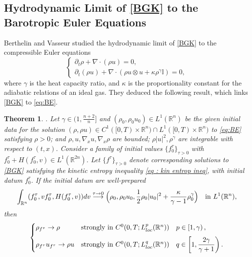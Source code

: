 \documentclass{amsart}
\theoremstyle{plain}
\newtheorem{theorem}{Theorem}[section]
\theoremstyle{remark}
\numberwithin{equation}{section}
\newcommand{\bbI}{\mathbb I}
\newcommand{\p}{\partial}
\newcommand{\R}{\mathbb{R}}
\newcommand{\dv}{\textnormal{d}v}
\newcommand{\To}{\longrightarrow}
\begin{document}
\subsection{Hydrodynamic Limit of \eqref{BGK} to the Barotropic Euler Equations} \label{subs: hyd}
Berthelin and Vasseur \cite{berthelinvasseur2005} studied the hydrodynamic limit of \eqref{BGK} to the compressible Euler equations
\begin{equation}
\label{eq:BE}
    \begin{cases}
        \p_t \rho + \nabla\cdot (\rho u) = 0,\\
        \p_t (\rho u) + \nabla \cdot (\rho u \otimes u + \kappa \rho^\gamma \bbI) = 0,
    \end{cases}
\end{equation}
where $\gamma$ is the heat capacity ratio, and $\kappa$ is the proportionality constant for the adiabatic relations of an ideal gas. They deduced the following result, which links \eqref{BGK} to \eqref{eq:BE}.
\begin{theorem}
\label{thm : hyd}
\cite[Theorem 1.1]{berthelinvasseur2005}. Let $\gamma \in (1,\frac{n+2}{n}]$ and $(\rho_0,\rho_0 u_0) \in L^1(\R^n)$ be the given initial data for the solution $(\rho, \rho u)\in C^1([0,T)\times\R^n) \cap L^1([0,T)\times \R^n)$ to \eqref{eq:BE} satisfying $\rho>0$; and $\rho,u,\nabla_x u, \nabla_x \rho$ are bounded; $\rho |u|^2,\rho^\gamma$ are integrable with respect to $(t,x)$. Consider a family of initial values $\{f^\tau_0\}_{\tau>0}$ with $f^\tau_0 + H(f^\tau_0,v)\in L^1(\R^{2n})$. Let $\{f^\tau\}_{\tau>0}$ denote corresponding solutions to \eqref{BGK} satisfying the kinetic entropy inequality \eqref{eq : kin entrop ineq}, with initial datum $f_0^\tau$. If the initial datum are \textit{well-prepared}
    \begin{align*}
        \int_{\R^n} (f_0^\tau, vf_0^\tau, H(f_0^\tau,v)) \dv \overset{\tau\to 0}{\To} \Big(\rho_0, \rho_0 u_0, \frac{1}{2}\rho_0 |u_0|^2 + \frac{\kappa}{\gamma-1}\rho_0^\gamma \Big) \quad \text{in } L^1(\R^n),
    \end{align*}
    then
    \begin{align*}
        \begin{cases}
            \rho_{f^\tau} \to \rho &\text{strongly in }C^0(0,T;L^p_{\rm loc}(\R^n)) \quad p\in \left[1,\gamma\right),\\[6pt]
            \rho_{f^\tau} u_{f^\tau} \to \rho u &\text{strongly in }C^0(0,T;L^q_{\rm loc}(\R^n)) \quad \displaystyle q\in \left[1,\frac{2\gamma}{\gamma+1}\right).\\
        \end{cases}
    \end{align*}
\end{theorem}
\end{document}
